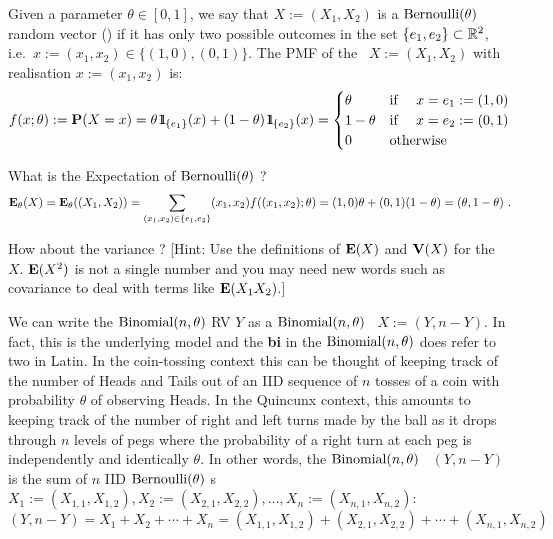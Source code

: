 \begin{model}[$\bernoulli(\theta)$ \rv]
Given a parameter $\theta \in [0,1]$, we say that $X := (X_1,X_2)$ is a $\bernoulli(\theta)$ random vector (\rv) if it has only two possible outcomes in the set $\{e_1,e_2\} \subset \mathbb{R}^2$, i.e.~$x:=(x_1,x_2) \in \{(1,0),(0,1)\}$.  The PMF of the \rv~$X:= (X_1,X_2)$ with realisation $x:=(x_1,x_2)$ is:
\[
f(x;\theta) := \mathbf{P}(X=x) = \theta \, {1}\mspace{-11 mu}{1}_{\{e_1\}}(x) + (1-\theta) \, {1}\mspace{-11 mu}{1}_{\{e_2\}}(x) =
\begin{cases}
\theta & \text{if } \quad x=e_1:=(1,0) \\
1- \theta & \text{if } \quad x=e_2:=(0,1) \\
0 & \text{otherwise}
\end{cases}
\]
\end{model}


\begin{classwork}
What is the Expectation of $\bernoulli(\theta)$ \rv?
\[
\mathbf{E}_{\theta}(X) = \mathbf{E}_{\theta}((X_1,X_2)) = \sum_{(x_1,x_2) \in \{e_1,e_2\}} (x_1,x_2) f((x_1,x_2);\theta) = (1,0) \theta + (0,1) (1-\theta) = (\theta,1-\theta) \ .
\]

How about the variance ? [Hint: Use the definitions of $\mathbf{E}(X)$ and $\mathbf{V}(X)$ for the \rv~$X$.  $\mathbf{E}(X^2)$ is not a single number and you may need new words such as covariance to deal with terms like $\mathbf{E}(X_1 X_2)$.]
\end{classwork}

We can write the $\mbox{{\rm Binomial}}(n,\theta)$ RV $Y$ as a $\mbox{{\rm Binomial}}(n,\theta)$ \rv~$X:=(Y,n-Y)$.  In fact, this is the underlying model and the {\bf bi} in the $\mbox{{\rm Binomial}}(n,\theta)$ does refer to two in Latin.  In the coin-tossing context this can be thought of keeping track of the number of Heads and Tails out of an IID sequence of $n$ tosses of a coin with probability $\theta$ of observing Heads.  In the Quincunx context, this amounts to keeping track of the number of right and left turns made by the ball as it drops through $n$ levels of pegs where the probability of a right turn at each peg is independently and identically $\theta$.  In other words, the $\mbox{{\rm Binomial}}(n,\theta)$ \rv~$(Y,n-Y)$ is the sum of $n$ IID $\bernoulli(\theta)$ {\rv}s $X_1:=(X_{1,1},X_{1,2}), X_2:=(X_{2,1},X_{2,2}), \ldots, X_n:=(X_{n,1},X_{n,2})$:
\[
(Y,n-Y) = X_1+X_2+\cdots + X_n = (X_{1,1},X_{1,2}) + (X_{2,1},X_{2,2}) + \cdots + (X_{n,1},X_{n,2})
\]

